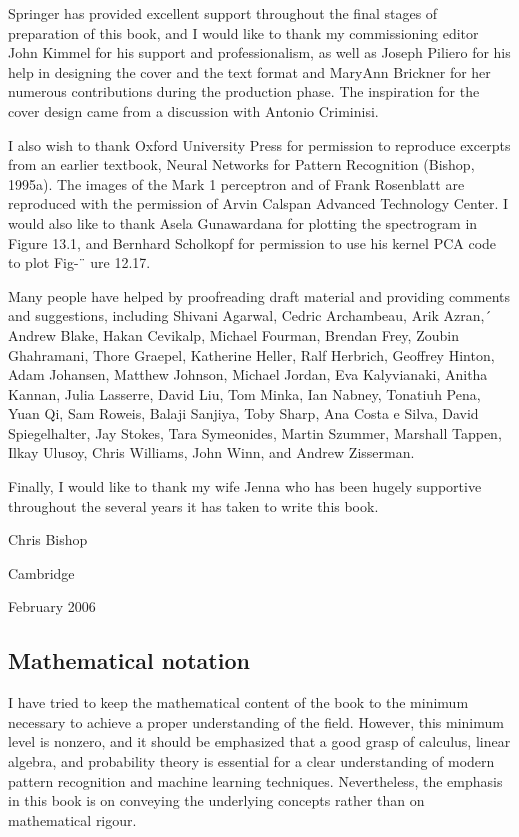 \documentclass[
  10
]{article}
\begin{document}
Springer has provided excellent support throughout the final stages of
preparation of this book, and I would like to thank my commissioning
editor John Kimmel for his support and professionalism, as well as
Joseph Piliero for his help in designing the cover and the text format
and MaryAnn Brickner for her numerous contributions during the
production phase. The inspiration for the cover design came from a
discussion with Antonio Criminisi.

I also wish to thank Oxford University Press for permission to reproduce
excerpts from an earlier textbook, Neural Networks for Pattern
Recognition (Bishop, 1995a). The images of the Mark 1 perceptron and of
Frank Rosenblatt are reproduced with the permission of Arvin Calspan
Advanced Technology Center. I would also like to thank Asela Gunawardana
for plotting the spectrogram in Figure 13.1, and Bernhard Scholkopf for
permission to use his kernel PCA code to plot Fig-¨ ure 12.17.

Many people have helped by proofreading draft material and providing
comments and suggestions, including Shivani Agarwal, Cedric Archambeau,
Arik Azran,´ Andrew Blake, Hakan Cevikalp, Michael Fourman, Brendan
Frey, Zoubin Ghahramani, Thore Graepel, Katherine Heller, Ralf Herbrich,
Geoffrey Hinton, Adam Johansen, Matthew Johnson, Michael Jordan, Eva
Kalyvianaki, Anitha Kannan, Julia Lasserre, David Liu, Tom Minka, Ian
Nabney, Tonatiuh Pena, Yuan Qi, Sam Roweis, Balaji Sanjiya, Toby Sharp,
Ana Costa e Silva, David Spiegelhalter, Jay Stokes, Tara Symeonides,
Martin Szummer, Marshall Tappen, Ilkay Ulusoy, Chris Williams, John
Winn, and Andrew Zisserman.

Finally, I would like to thank my wife Jenna who has been hugely
supportive throughout the several years it has taken to write this book.

Chris Bishop

Cambridge

February 2006

\subsection{Mathematical notation}\label{mathematical-notation}

I have tried to keep the mathematical content of the book to the minimum
necessary to achieve a proper understanding of the field. However, this
minimum level is nonzero, and it should be emphasized that a good grasp
of calculus, linear algebra, and probability theory is essential for a
clear understanding of modern pattern recognition and machine learning
techniques. Nevertheless, the emphasis in this book is on conveying the
underlying concepts rather than on mathematical rigour.
\end{document}

